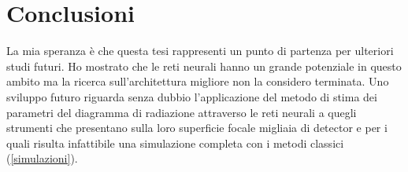 \documentclass[12pt,a4paper,final]{book}
\begin{document}








\chapter{Conclusioni}\label{conclusioni}
La mia speranza è che questa tesi rappresenti un punto di partenza per ulteriori studi futuri. Ho mostrato che le reti neurali hanno un grande potenziale in questo ambito ma la ricerca sull'architettura migliore non la considero terminata. Uno sviluppo futuro riguarda senza dubbio l'applicazione del metodo di stima dei parametri del diagramma di radiazione attraverso le reti neurali a quegli strumenti che presentano sulla loro superficie focale migliaia di detector e per i quali risulta infattibile una simulazione completa con i metodi classici (\ref{simulazioni}).



\nocite{*}
{}

\end{document}
